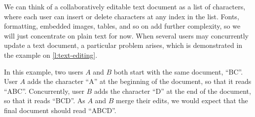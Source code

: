 \begin{frame}
    \label{s:google-docs}
\end{frame}
\label{l:google-docs}


We can think of a collaboratively editable text document as a list of characters, where each user can insert or delete characters at any index in the list.
Fonts, formatting, embedded images, tables, and so on add further complexity, so we will just concentrate on plain text for now.
When several users may concurrently update a text document, a particular problem arises, which is demonstrated in the example on \autoref{l:text-editing}.

In this example, two users $A$ and $B$ both start with the same document, ``BC''.
User $A$ adds the character ``A'' at the beginning of the document, so that it reads ``ABC''.
Concurrently, user $B$ adds the character ``D'' at the end of the document, so that it reads ``BCD''.
As $A$ and $B$ merge their edits, we would expect that the final document should read ``ABCD''.

